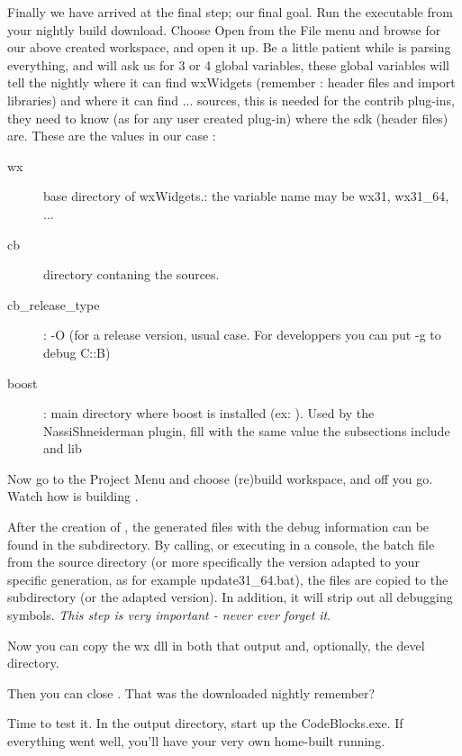 Finally we have arrived at the final step; our final goal. Run the \codeblocks executable from your nightly build download. Choose Open from the File menu and browse for our above created workspace, and open it up. Be a little patient while \codeblocks is parsing everything, and \codeblocks will ask us for 3 or 4 global variables, these global variables will tell the nightly \codeblocks where it can find wxWidgets (remember : header files and import libraries) and where it can find ... \codeblocks sources, this is needed for the contrib plug-ins, they need to know (as for any user created plug-in) where the sdk (\codeblocks header files) are. These are the values in our case : 
\begin{description}
\item[wx]  base directory of wxWidgets.: the variable name may be wx31, wx31\_64, ...
\item[cb]  \codeblocks directory contaning the sources.
\item[cb\_release\_type] : -O (for a release version, usual case.
         For developpers you can put -g to debug C::B)
\item[boost] : main directory where boost is installed (ex: ).
         Used by the NassiShneiderman plugin,
         fill with the same value the subsections include and lib
\end{description}

Now go to the Project Menu and choose (re)build workspace, and off you go. Watch how \codeblocks is building \codeblocks.

After the creation of \codeblocks, the generated files with the debug information can be found in the  subdirectory. By calling, or executing in a console, the batch file  from the source directory  (or more specifically the version adapted to your specific generation, as for example update31\_64.bat), the files are copied to the  subdirectory (or the adapted version). In addition, it will strip out all debugging symbols. \textit{This step is very important - never ever forget it}.

Now you can copy the wx dll in both that output and, optionally, the devel directory.

Then you can close \codeblocks. That was the downloaded nightly remember?

Time to test it. In the output directory, start up the CodeBlocks.exe. If everything went well, you'll have your very own home-built \codeblocks running.

